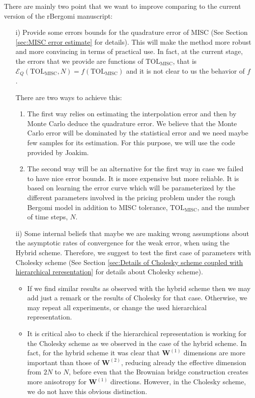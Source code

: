 There are mainly two point that we want to improve comparing to the current version of the rBergomi manuscript:

\begin{itemize}
\item[i)] Provide some errors bounds for the quadrature error of MISC (See Section \ref{sec:MISC error estimate} for details). This will make the method more robust and more convincing in terms of practical use. In fact, at the current stage, the errors that we provide are functions of $\text{TOL}_{\text{MISC}}$, that is $ \mathcal{E}_Q(\text{TOL}_{\text{MISC}},N)=f(\text{TOL}_{\text{MISC}})$ and it is not clear to us the behavior of $f$.

There are two ways to achieve this:

\begin{enumerate}
\item The first way relies on estimating the interpolation error and then by Monte Carlo deduce the quadrature error. We believe that the Monte Carlo error will be dominated by the statistical error and we need maybe few samples for its estimation. For this purpose, we will use the code provided by Joakim.  

\item The second way will be an alternative for the first way in case we failed to have nice error bounds. It is more expensive but more reliable. It is based on learning the error curve which will be parameterized by the different parameters involved in the pricing problem under the rough Bergomi model in addition to MISC tolerance, $\text{TOL}_{\text{MISC}}$, and the number of time steps, $N$.
\end{enumerate}

\item[ii)] Some internal beliefs that maybe we are making wrong assumptions about the asymptotic rates of convergence for the weak error, when using the Hybrid scheme. Therefore, we suggest to test the first case of parameters with Cholesky scheme (See Section \ref{sec:Details of Cholesky scheme coupled with hierarchical reresentation} for details about Cholesky scheme). 

\begin{itemize}
\item If we find similar results as observed with the hybrid scheme then we may add just a remark or the results of Cholesky for that case. Otherwise, we may repeat all experiments, or change the used hierarchical representation. 
\item It is critical also to check if the hierarchical representation is working for the Cholesky scheme as we observed in the case of the hybrid scheme. In fact, for the hybrid scheme it was clear that $\mathbf{W}^{(1)}$ dimensions are more important than those of $\mathbf{W}^{(2)}$, reducing already  the effective dimension from $2N$ to $N$, before even that the Brownian bridge construction creates more anisotropy for  $\mathbf{W}^{(1)}$ directions. However, in the Cholesky scheme, we do not have this obvious distinction.
\end{itemize}
\end{itemize}
